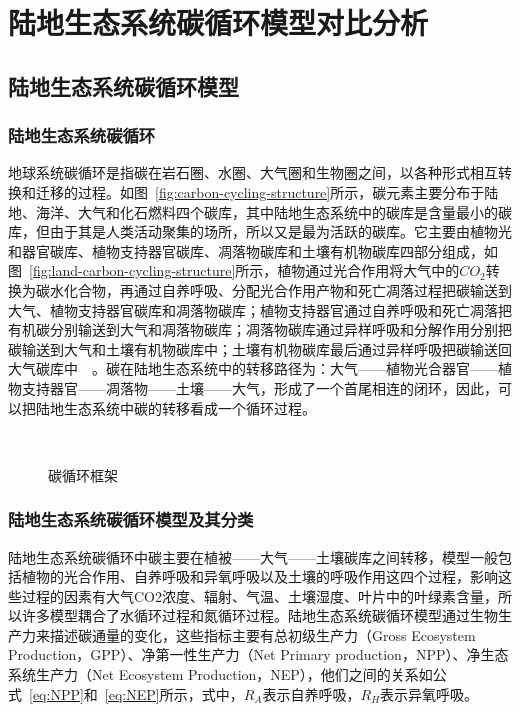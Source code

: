 \chapter{陆地生态系统碳循环模型对比分析}
\label{chap:model}

\section{陆地生态系统碳循环模型}
\label{sec:model}
\subsection{陆地生态系统碳循环}
地球系统碳循环是指碳在岩石圈、水圈、大气圈和生物圈之间，以各种形式相互转换和迁移的过程。如图~\ref{fig:carbon-cycling-structure}所示，碳元素主要分布于陆地、海洋、大气和化石燃料四个碳库，其中陆地生态系统中的碳库是含量最小的碳库，但由于其是人类活动聚集的场所，所以又是最为活跃的碳库。它主要由植物光和器官碳库、植物支持器官碳库、凋落物碳库和土壤有机物碳库四部分组成，如图~\ref{fig:land-carbon-cycling-structure}所示，植物通过光合作用将大气中的$CO_2$转换为碳水化合物，再通过自养呼吸、分配光合作用产物和死亡凋落过程把碳输送到大气、植物支持器官碳库和凋落物碳库；植物支持器官通过自养呼吸和死亡凋落把有机碳分别输送到大气和凋落物碳库；凋落物碳库通过异样呼吸和分解作用分别把碳输送到大气和土壤有机物碳库中；土壤有机物碳库最后通过异样呼吸把碳输送回大气碳库中~\cite{2004地球系统碳循环}~\cite{毛留喜2006陆地生态系统碳循环模型研究概述}。碳在陆地生态系统中的转移路径为：大气——植物光合器官——植物支持器官——凋落物——土壤——大气，形成了一个首尾相连的闭环，因此，可以把陆地生态系统中碳的转移看成一个循环过程。

\begin{figure}[!htbp]
    \centering
    \hfill
     \\
    \caption{碳循环框架}
    \label{fig:carbon-cycling}
\end{figure}

\subsection{陆地生态系统碳循环模型及其分类}
陆地生态系统碳循环中碳主要在植被——大气——土壤碳库之间转移，模型一般包括植物的光合作用、自养呼吸和异氧呼吸以及土壤的呼吸作用这四个过程，影响这些过程的因素有大气CO2浓度、辐射、气温、土壤湿度、叶片中的叶绿素含量，所以许多模型耦合了水循环过程和氮循环过程。陆地生态系统碳循环模型通过生物生产力来描述碳通量的变化，这些指标主要有总初级生产力（Gross Ecosystem Production，GPP）、净第一性生产力（Net Primary production，NPP）、净生态系统生产力（Net Ecosystem Production，NEP），他们之间的关系如公式~\ref{eq:NPP}和~\ref{eq:NEP}所示，式中，$R_A$表示自养呼吸，$R_H$表示异氧呼吸。

